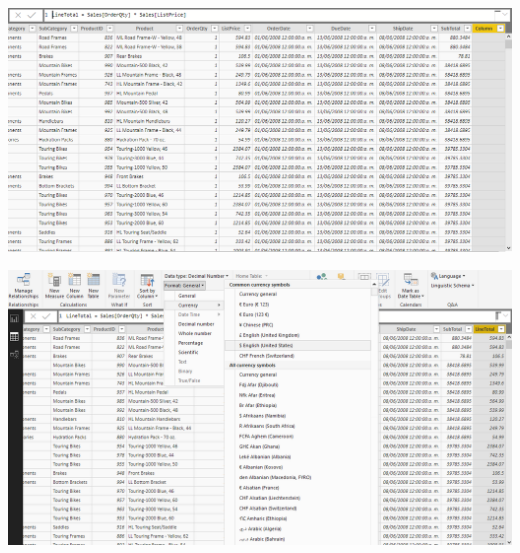 	\begin{center}
	\includegraphics[width=15cm]{./Imagenes/power10}
	\end{center}	

	\begin{center}
	\includegraphics[width=15cm]{./Imagenes/power11}
	\end{center}	

